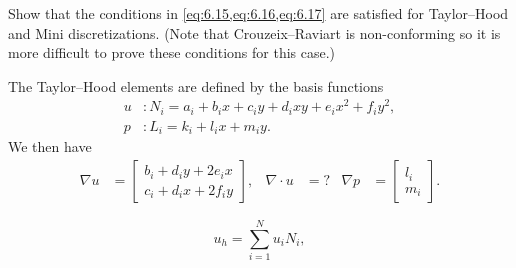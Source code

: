 \begin{comment}
    For \cref{eq:6.17}, we have
    \begin{equation}
        a(u_h, u_h)
        = \int_{\Omega} \nabla u_h : \nabla u_h \diff x
        = \norm{\nabla u_h}_{L^2}^2 = \abs{u_h}_{H^1}^2.
    \end{equation}
    As we have previously shown that the $H^1$ semi-norm is equivalent to the $H^1$ norm, \cref{eq:6.17} is satisfied.

    We have thus shown that the conditions in \cref{eq:6.15,eq:6.16,eq:6.17} are satisfied for $V_h = H^1_0$ and $Q_h = L^2$.
\end{solution}
\end{comment}

\begin{exercise}{6.2}
    Show that the conditions in \cref{eq:6.15,eq:6.16,eq:6.17} are satisfied for Taylor--Hood and Mini discretizations. %
    (Note that Crouzeix--Raviart is non-conforming so it is more difficult to prove these conditions for this case.) %
\end{exercise}

\begin{solution}{6.2}
    The Taylor--Hood elements are defined by the basis functions %
    \begin{equation}
        \begin{split}
            u &: N_i = a_i + b_i x + c_i y + d_i x y + e_i x^2 + f_i y^2, \\
            p &: L_i = k_i + l_i x + m_i y.
        \end{split}
    \end{equation}
    We then have
    \begin{align*}
        \nabla u &=
        \begin{bmatrix}
            b_i + d_i y + 2 e_i x \\
            c_i + d_i x + 2 f_i y
        \end{bmatrix},
        &
        \nabla \cdot u &= ?
        &
        \nabla p &=
        \begin{bmatrix}
            l_i \\
            m_i
        \end{bmatrix}.
    \end{align*}

    \begin{equation}
        u_h = \sum_{i = 1}^{N} u_i N_i,
    \end{equation}
\end{solution}